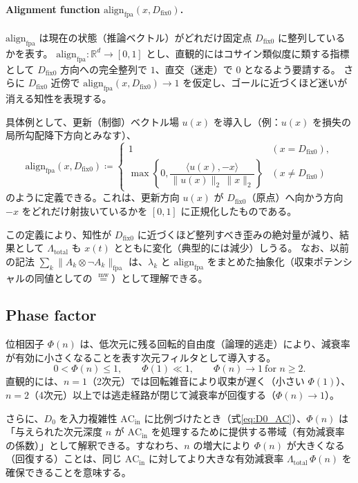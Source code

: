 \documentclass[12pt,a4paper]{article}
\newcommand{\dfix}{D_{\text{fix0}}}
\newcommand{\mweq}{\mathrel{\overset{\mathrm{mw}}{=}}}
\begin{document}
\paragraph{Alignment function $\mathrm{align}_{\mathrm{fpa}}(x,\dfix)$.}
$\mathrm{align}_{\mathrm{fpa}}$ は現在の状態（推論ベクトル）がどれだけ固定点 $\dfix$ に整列しているかを表す。
$\mathrm{align}_{\mathrm{fpa}}: \mathbb{R}^d \to [0,1]$ とし、直観的にはコサイン類似度に類する指標として
$\dfix$ 方向への完全整列で $1$、直交（迷走）で $0$ となるよう要請する。
さらに $\dfix$ 近傍で $\mathrm{align}_{\mathrm{fpa}}(x,\dfix)\to 1$ を仮定し、ゴールに近づくほど迷いが消える知性を表現する。

具体例として、更新（制御）ベクトル場 $u(x)$ を導入し（例：$u(x)$ を損失の局所勾配降下方向とみなす）、
\begin{equation}
  \mathrm{align}_{\mathrm{fpa}}(x,\dfix) \coloneqq
  \begin{cases}
    1 & (x=\dfix),\\
    \max\left\{0,\dfrac{\langle u(x), -x\rangle}{\lVert u(x)\rVert_2\,\lVert x\rVert_2}\right\} & (x\neq \dfix)
  \end{cases}
  \label{eq:align_example}
\end{equation}
のように定義できる。これは、更新方向 $u(x)$ が $\dfix$（原点）へ向かう方向 $-x$ をどれだけ射抜いているかを $[0,1]$ に正規化したものである。

この定義により、知性が $\dfix$ に近づくほど整列すべき歪みの絶対量が減り、結果として $\Lambda_{\mathrm{total}}$ も $x(t)$ とともに変化（典型的には減少）しうる。
なお、以前の記法 $\sum_k \lVert A_k\otimes \neg A_k\rVert_{\mathrm{fpa}}$ は、$\lambda_k$ と $\mathrm{align}_{\mathrm{fpa}}$ をまとめた抽象化（収束ポテンシャルの同値としての $\mweq$）として理解できる。

\subsection{Phase factor}
位相因子 $\Phi(n)$ は、低次元に残る回転的自由度（論理的逃走）により、減衰率が有効に小さくなることを表す次元フィルタとして導入する。
\begin{equation}
  0 < \Phi(n) \le 1, \qquad \Phi(1) \ll 1, \qquad \Phi(n) \to 1 \ \text{for } n \ge 2.
  \label{eq:phi_limit}
\end{equation}
直観的には、$n=1$（2次元）では回転雑音により収束が遅く（小さい $\Phi(1)$）、$n=2$（4次元）以上では逃走経路が閉じて減衰率が回復する（$\Phi(n)\to 1$）。

さらに、$D_0$ を入力複雑性 $\mathrm{AC}_{\mathrm{in}}$ に比例づけたとき（式\eqref{eq:D0_AC}）、$\Phi(n)$ は「与えられた次元深度 $n$ が $\mathrm{AC}_{\mathrm{in}}$ を処理するために提供する帯域（有効減衰率の係数）」として解釈できる。すなわち、$n$ の増大により $\Phi(n)$ が大きくなる（回復する）ことは、同じ $\mathrm{AC}_{\mathrm{in}}$ に対してより大きな有効減衰率 $\Lambda_{\mathrm{total}}\,\Phi(n)$ を確保できることを意味する。
\end{document}
